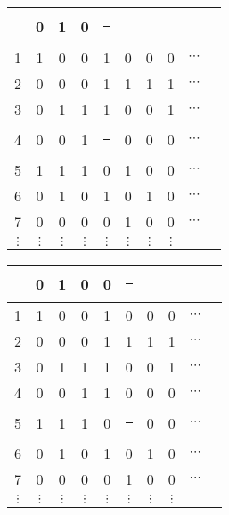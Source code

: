 \documentclass[compress,17pt]{beamer}
\newcommand\hl{\bgroup\markoverwith
    {\textcolor{yellow}{\rule[-.5ex]{.1pt}{2.5ex}}}\ULon}
\begin{document}
\begin{frame}
  \begin{tabular}{ | c | c c c c c c c c c }
    \hline
    &  0 & 1 & 0 & \hl 0 \\
    \hline

    1 & 1 & 0 & 0 & 1 & 0 & 0 & 0 & $\cdots$\\
    2 & 0 & 0 & 0 & 1 & 1 & 1 & 1 & $\cdots$\\
    3 & 0 & 1 & 1 & 1 & 0 & 0 & 1 & $\cdots$\\
    4 & 0 & 0 & 1 & \hl 1 & 0 & 0 & 0 & $\cdots$\\
    5 & 1 & 1 & 1 & 0 & 1 & 0 & 0 & $\cdots$\\
    6 & 0 & 1 & 0 & 1 & 0 & 1 & 0 & $\cdots$\\
    7 & 0 & 0 & 0 & 0 & 1 & 0 & 0 & $\cdots$\\
    $\vdots$ & $\vdots$ & $\vdots$ & $\vdots$ & $\vdots$ & $\vdots$ & $\vdots$ & $\vdots$ & \\
  \end{tabular}
\end{frame}

\begin{frame}
  \begin{tabular}{ | c | c c c c c c c c c }
    \hline
    &  0 & 1 & 0 & 0 & \hl 0 \\
    \hline

    1 & 1 & 0 & 0 & 1 & 0 & 0 & 0 & $\cdots$\\
    2 & 0 & 0 & 0 & 1 & 1 & 1 & 1 & $\cdots$\\
    3 & 0 & 1 & 1 & 1 & 0 & 0 & 1 & $\cdots$\\
    4 & 0 & 0 & 1 & 1 & 0 & 0 & 0 & $\cdots$\\
    5 & 1 & 1 & 1 & 0 & \hl 1 & 0 & 0 & $\cdots$\\
    6 & 0 & 1 & 0 & 1 & 0 & 1 & 0 & $\cdots$\\
    7 & 0 & 0 & 0 & 0 & 1 & 0 & 0 & $\cdots$\\
    $\vdots$ & $\vdots$ & $\vdots$ & $\vdots$ & $\vdots$ & $\vdots$ & $\vdots$ & $\vdots$ & \\
  \end{tabular}
\end{frame}
\end{document}
